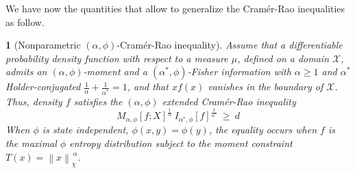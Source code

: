 \documentclass[english,sort&compress]{elsarticle}
\theoremstyle{definition}
\theoremstyle{plain}
\newtheorem{prop}{\protect\propositionname}
\theoremstyle{plain}
\providecommand{\propositionname}{Proposition}
\def\X{\mathcal{X}}
\begin{document}
We  have  now   the  quantities  that  allow  to   generalize  the  Cram\'er-Rao
inequalities as follow.
%
\begin{prop}[Nonparametric                           $(\alpha,\phi)$-Cram\'er-Rao
  inequality]\label{prop:np-phi-CR}
  Assume that  a differentiable probability  density function with respect  to a
  measure $\mu$, defined on a  domain $\X$, admits an $(\alpha,\phi)$-moment and
  a  $(\alpha^*,\phi)$-Fisher information  with  $\alpha \ge  1$ and  $\alpha^*$
  Holder-conjugated  $\frac{1}{\alpha} +  \frac{1}{\alpha^*} =  1$, and  that $x
  f(x)$  vanishes in  the boundary  of $\X$.   Thus, density  $f$  satisfies the
  $(\alpha,\phi)$ extended Cram\'er-Rao inequality
  \begin{equation}\label{eq:np-phi-CR}
   M_{\alpha,\phi}[f;X]^{\frac{1}{\alpha}} \: I_{\alpha^*\!,\phi}[f]^{\frac{1}{\alpha^*}}
   \: \ge \: d
  \end{equation}
  When $\phi$ is  state independent, $\phi(x,y) = \phi(y)$,  the equality occurs
  when  $f$ is the  maximal $\phi$  entropy distribution  subject to  the moment
  constraint $T(x) = \left\| x \right\|_{\chi}^{\, \alpha}$.
\end{prop}
\end{document}
